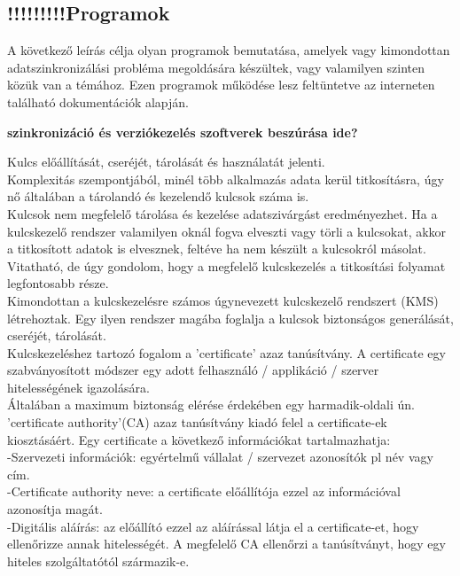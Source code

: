 \subsection{!!!!!!!!!Programok}
A következő leírás célja olyan programok bemutatása, amelyek vagy kimondottan adatszinkronizálási probléma megoldására készültek, vagy valamilyen szinten közük van a témához. Ezen programok működése lesz feltüntetve az interneten található dokumentációk alapján.

\textbf{szinkronizáció és verziókezelés szoftverek beszúrása ide?}



Kulcs előállítását, cseréjét, tárolását és használatát jelenti.
\vspace{5pt} \\Komplexitás szempontjából, minél több alkalmazás adata kerül titkosításra, úgy nő általában a tárolandó és kezelendő kulcsok száma is.
\vspace{5pt} \\Kulcsok nem megfelelő tárolása és kezelése adatszivárgást eredményezhet. Ha a kulcskezelő rendszer valamilyen oknál fogva elveszti vagy törli a kulcsokat, akkor a titkosított adatok is elvesznek, feltéve ha nem készült a kulcsokról másolat.
\vspace{5pt} \\Vitatható, de úgy gondolom, hogy a megfelelő kulcskezelés a titkosítási folyamat legfontosabb része.
\vspace{5pt} \\Kimondottan a kulcskezelésre számos úgynevezett kulcskezelő rendszert (KMS) létrehoztak. Egy ilyen rendszer magába foglalja a kulcsok biztonságos generálását, cseréjét, tárolását.
\vspace{5pt} \\Kulcskezeléshez tartozó fogalom a ’certificate’ azaz tanúsítvány. A certificate egy szabványosított módszer egy adott felhasználó / applikáció / szerver hitelességének igazolására.
\vspace{5pt} \\Általában a maximum biztonság elérése érdekében egy harmadik-oldali ún. ’certificate authority’(CA) azaz tanúsítvány kiadó felel a certificate-ek kiosztásáért. Egy certificate a következő információkat tartalmazhatja:
\vspace{5pt} \\-Szervezeti információk: egyértelmű vállalat / szervezet azonosítók pl név vagy cím.
\vspace{5pt} \\-Certificate authority neve: a certificate előállítója ezzel az információval azonosítja magát.
\vspace{5pt} \\-Digitális aláírás: az előállító ezzel az aláírással látja el a certificate-et, hogy ellenőrizze annak hitelességét. A megfelelő CA ellenőrzi a tanúsítványt, hogy egy hiteles szolgáltatótól származik-e.


